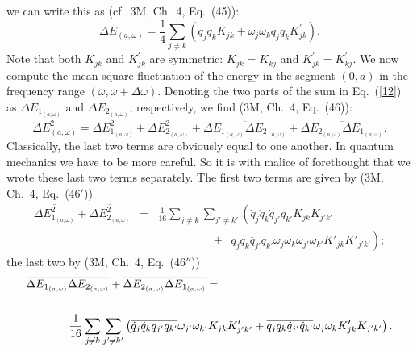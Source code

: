 \documentclass{elsart}
\begin{document}
we can write this as (cf.\ 3M, Ch.\ 4, Eq.\ (45)):
\begin{equation}
\Delta E_{(a, \omega)} =  \frac{1}{4}  \sum_{j \neq k} \left( \dot{q}_j \dot{q}_k K_{jk}
+ \omega_j \omega_k q_j q_k K^\prime_{jk} \right).
\label{12}
\end{equation}
Note that both $K_{jk}$ and $K^\prime_{jk}$ are symmetric: $K_{jk} = K_{kj}$ and $K^\prime_{jk} = K^\prime_{kj}$.
We now compute the mean square fluctuation of the energy in the segment $(0, a)$  in the frequency range $(\omega, \omega + \Delta \omega)$. Denoting the two parts of the sum in Eq.\ (\ref{12}) as $\Delta E_{1_{(a, \omega)}}$ and $\Delta E_{2_{(a, \omega)}}$, respectively, we find (3M, Ch.\ 4, Eq.\ (46)):
\begin{equation}
\overline{\Delta E_{(a, \omega)}^2}  =  \overline{\Delta E_{1_{(a, \omega)}}^2} + \overline{\Delta E_{2_{(a, \omega)}}^2} + 
\overline{\Delta E_{1_{(a, \omega)}} \Delta E_{2_{(a, \omega)}}} + \overline{\Delta E_{2_{(a, \omega)}} \Delta E_{1_{(a, \omega)}}}.
\label{13}
\end{equation}
Classically, the last two terms are obviously equal to one another. In quantum mechanics we have to be more careful. So it is with malice of forethought that we wrote these last two terms separately. The first two terms are given by (3M, Ch.\ 4, Eq.\ (46$'$))
\begin{eqnarray}
\overline{\Delta E_{1_{(a, \omega)}}^2} + \overline{\Delta E_{2_{(a, \omega)}}^2} & = &
\frac{1}{16}  \sum_{j \neq k}  \sum_{j' \neq k'} \left(
\overline{ \dot{q}_j \dot{q}_k  \dot{q}_{j'} \dot{q}_{k'}} K_{jk} K_{j'k'}  \right. \nonumber \\
 & & \;\;\;\;\;\;\;\;\;\;\;\;\;\;\;\;\; + \;\; \left.
\overline{q_j q_k q_{j'} q_{k'}}  \omega_j \omega_k \omega_{j'} \omega_{k'}
 K'_{jk} K'_{j'k'} \right);
\label{14}
\end{eqnarray}
the last two by (3M, Ch.\ 4, Eq.\ (46$''$))
\begin{eqnarray}
\lefteqn{ \overline{\Delta E_{1_{(a, \omega)}} \Delta E_{2_{(a, \omega)}}} + \overline{\Delta E_{2_{(a, \omega)}} \Delta E_{1_{(a, \omega)}}} = }
 & & \nonumber \\
 & &\label{15} \\
 & & \;\;\;\;\;\;\;\;\;\; \frac{1}{16}  \sum_{j \neq k}  \sum_{j' \neq k'} 
\left( \overline{\dot{q}_j \dot{q}_k q_{j'} q_{k'} } \omega_{j'} \omega_{k'}  K_{jk} K'_{j'k'}
 +
 \overline{q_j q_k \dot{q}_{j'} \dot{q}_{k'}} \omega_j \omega_k K'_{jk} K_{j'k'}\right).  \nonumber
\end{eqnarray}
\end{document}

